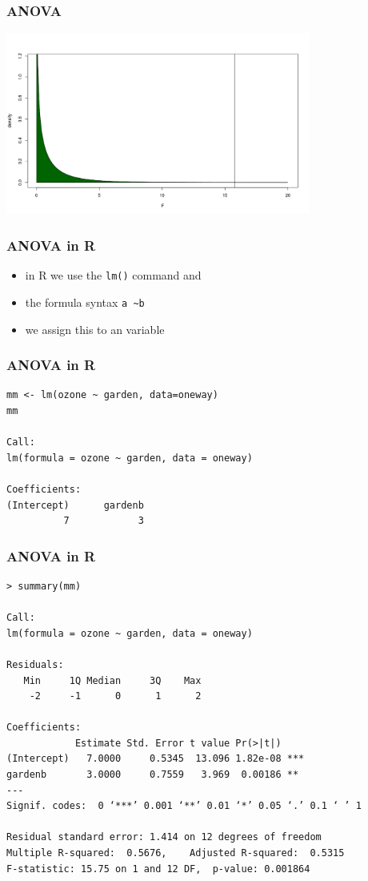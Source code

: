 \begin{frame}\frametitle{ANOVA}
\begin{center}
\includegraphics[width=10cm]{img/fdens.png}
\end{center}
\end{frame}


\begin{frame}[fragile]\frametitle{ANOVA in R}
  \begin{itemize}
  \item in R we use the \texttt{lm()} command and
  \item the formula syntax \texttt{a \sim  b}
  \item we assign this to an variable
 \end{itemize}
\end{frame}


\begin{frame}[fragile]\frametitle{ANOVA in R}
\begin{verbatim}
mm <- lm(ozone ~ garden, data=oneway)
mm

Call:
lm(formula = ozone ~ garden, data = oneway)

Coefficients:
(Intercept)      gardenb  
          7            3  
\end{verbatim}
\end{frame}


\begin{frame}[fragile]\frametitle{ANOVA in R}
\footnotesize
\begin{verbatim}
> summary(mm)

Call:
lm(formula = ozone ~ garden, data = oneway)

Residuals:
   Min     1Q Median     3Q    Max 
    -2     -1      0      1      2 

Coefficients:
            Estimate Std. Error t value Pr(>|t|)    
(Intercept)   7.0000     0.5345  13.096 1.82e-08 ***
gardenb       3.0000     0.7559   3.969  0.00186 ** 
---
Signif. codes:  0 ‘***’ 0.001 ‘**’ 0.01 ‘*’ 0.05 ‘.’ 0.1 ‘ ’ 1

Residual standard error: 1.414 on 12 degrees of freedom
Multiple R-squared:  0.5676,	Adjusted R-squared:  0.5315 
F-statistic: 15.75 on 1 and 12 DF,  p-value: 0.001864
\end{verbatim}
\end{frame}


